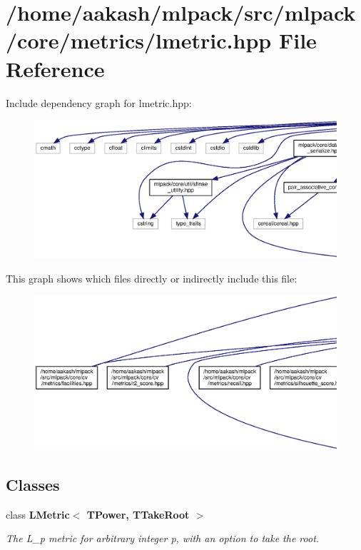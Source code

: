 \section{/home/aakash/mlpack/src/mlpack/core/metrics/lmetric.hpp File Reference}
\label{lmetric_8hpp}
Include dependency graph for lmetric.\+hpp\+:
\nopagebreak
\begin{figure}[H]
\begin{center}
\leavevmode
\includegraphics[width=350pt]{lmetric_8hpp__incl}
\end{center}
\end{figure}
This graph shows which files directly or indirectly include this file\+:
\nopagebreak
\begin{figure}[H]
\begin{center}
\leavevmode
\includegraphics[width=350pt]{lmetric_8hpp__dep__incl}
\end{center}
\end{figure}
\subsection*{Classes}
\begin{DoxyCompactItemize}
\item 
class \textbf{ L\+Metric$<$ T\+Power, T\+Take\+Root $>$}
\begin{DoxyCompactList}\small\item\em The L\+\_\+p metric for arbitrary integer p, with an option to take the root. \end{DoxyCompactList}\end{DoxyCompactItemize}
